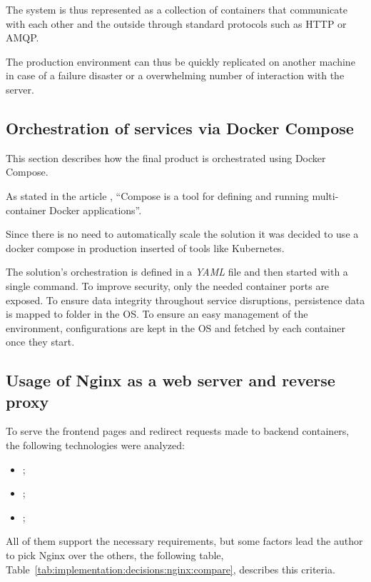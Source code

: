 The system is thus represented as a collection of containers that communicate with each other and the outside through standard protocols such as HTTP or AMQP.

The production environment can thus be quickly replicated on another machine in case of a failure disaster or a overwhelming number of interaction with the server.

\subsection{Orchestration of services via Docker Compose}
\label{subsec:implementation:decisions:compose}

This section describes how the final product is orchestrated using Docker Compose.

As stated in the article , ``Compose is a tool for defining and running multi-container Docker applications''. 

Since there is no need to automatically scale the solution it was decided to use a docker compose in production inserted of tools like Kubernetes.

The solution's orchestration is defined in a \textit{YAML} file and then started with a single command. To improve security, only the needed container ports are exposed. To ensure data integrity throughout service disruptions, persistence data is mapped to folder in the \gls{OS}. To ensure an easy management of the environment, configurations are kept in the \gls{OS} and fetched by each container once they start. 

\subsection{Usage of Nginx as a web server and reverse proxy}
\label{subsec:implementation:decisions:nginx}

To serve the frontend pages and redirect requests made to backend containers, the following technologies were analyzed:

\begin{itemize}
    \item {};
    \item {};
    \item {};
\end{itemize}

All of them support the necessary requirements, but some factors lead the author to pick Nginx over the others, the following table, Table~\ref{tab:implementation:decisions:nginx:compare}, describes this criteria.

